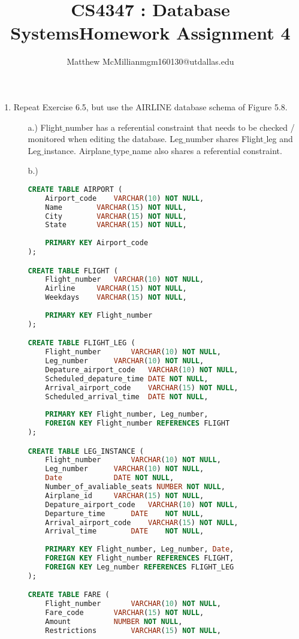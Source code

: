 \documentclass[12pt]{article}
\begin{document}
\title{CS4347 : Database SystemsHomework Assignment 4}
\author{Matthew McMillianmgm160130@utdallas.edu}
\maketitle



\begin{enumerate}
	\item Repeat Exercise 6.5, but use the AIRLINE database schema of Figure 5.8.
	\begin{enumerate}
		\item[a.)] Flight$\_$number has a referential constraint that needs to be checked / monitored when editing the database. Leg$\_$number shares Flight$\_$leg and Leg$\_$instance. Airplane$\_$type$\_$name also shares a referential constraint.
		\item[b.)] 
		\begin{lstlisting}[language=sql]
CREATE TABLE AIRPORT (
	Airport_code	VARCHAR(10) NOT NULL,
	Name		VARCHAR(15) NOT NULL,
	City		VARCHAR(15) NOT NULL,
	State 		VARCHAR(15) NOT NULL,
	
	PRIMARY KEY Airport_code
);

CREATE TABLE FLIGHT (
	Flight_number	VARCHAR(10) NOT NULL,
	Airline		VARCHAR(15) NOT NULL,
	Weekdays	VARCHAR(15) NOT NULL,
	
	PRIMARY KEY Flight_number
);

CREATE TABLE FLIGHT_LEG (
	Flight_number		VARCHAR(10) NOT NULL,
	Leg_number		VARCHAR(10) NOT NULL,
	Depature_airport_code	VARCHAR(10) NOT NULL,
	Scheduled_depature_time	DATE NOT NULL,
	Arrival_airport_code	VARCHAR(15) NOT NULL,
	Scheduled_arrival_time	DATE NOT NULL,
	
	PRIMARY KEY Flight_number, Leg_number,
	FOREIGN KEY Flight_number REFERENCES FLIGHT
);

CREATE TABLE LEG_INSTANCE (
	Flight_number		VARCHAR(10) NOT NULL,
	Leg_number		VARCHAR(10) NOT NULL,
	Date			DATE NOT NULL,
	Number_of_avaliable_seats NUMBER NOT NULL,
	Airplane_id		VARCHAR(15) NOT NULL,
	Depature_airport_code	VARCHAR(10) NOT NULL,
	Departure_time		DATE	NOT NULL,
	Arrival_airport_code	VARCHAR(15) NOT NULL,
	Arrival_time		DATE	NOT NULL,
	
	PRIMARY KEY Flight_number, Leg_number, Date,
	FOREIGN KEY Flight_number REFERENCES FLIGHT,
	FOREIGN KEY Leg_number REFERENCES FLIGHT_LEG
);

CREATE TABLE FARE (
	Flight_number		VARCHAR(10) NOT NULL,
	Fare_code		VARCHAR(15) NOT NULL,
	Amount			NUMBER NOT NULL,
	Restrictions		VARCHAR(15) NOT NULL,
	

\end{lstlisting}
\end{enumerate}
\end{enumerate}
\end{document}
